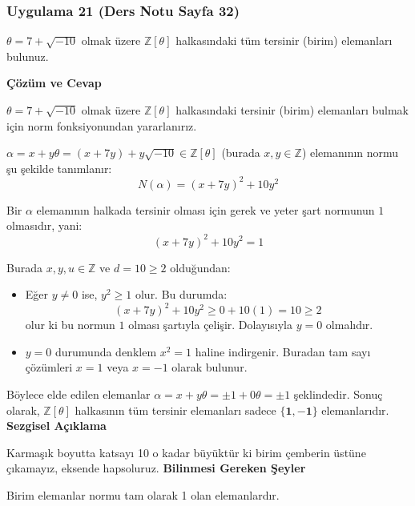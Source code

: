 \documentclass[11pt, a4paper]{article}
\newenvironment{cozum}{
    \vspace{0.5cm}
    \noindent\textcolor{green!60!black}{\faCheckCircle\enspace \textbf{\Large Çözüm ve Cevap}}\par\vspace{0.2cm}
}{}
\newenvironment{sezgisel}{
    \vspace{0.5cm}
    \noindent\textcolor{orange!80!black}{\faLightbulb\enspace \textbf{\Large Sezgisel Açıklama}}\par\vspace{0.2cm}
    \itshape
}{}
\newenvironment{bilgi}{
    \vspace{0.5cm}
    \noindent\textcolor{red!70!black}{\faExclamationTriangle\enspace \textbf{\Large Bilinmesi Gereken Şeyler}}\par\vspace{0.2cm}
}{}
\begin{document}
\subsubsection{Uygulama 21 (Ders Notu Sayfa 32)}
\begin{sorubox}
$\theta = 7 + \sqrt{-10}$ olmak üzere $\mathbb{Z}[\theta]$ halkasındaki tüm tersinir (birim) elemanları bulunuz.
\end{sorubox}
\begin{cozum}
$\theta = 7 + \sqrt{-10}$ olmak üzere $\mathbb{Z}[\theta]$ halkasındaki tersinir (birim) elemanları bulmak için norm fonksiyonundan yararlanırız.

$\alpha = x + y\theta = (x + 7y) + y\sqrt{-10} \in \mathbb{Z}[\theta]$ (burada $x, y \in \mathbb{Z}$) elemanının normu şu şekilde tanımlanır:
\[ N(\alpha) = (x + 7y)^2 + 10 y^2 \]

Bir $\alpha$ elemanının halkada tersinir olması için gerek ve yeter şart normunun $1$ olmasıdır, yani:
\[ (x + 7y)^2 + 10 y^2 = 1 \]

Burada $x, y, u \in \mathbb{Z}$ ve $d = 10 \ge 2$ olduğundan:
\begin{itemize}
    \item Eğer $y \neq 0$ ise, $y^2 \ge 1$ olur. Bu durumda:
    \[ (x + 7y)^2 + 10 y^2 \ge 0 + 10(1) = 10 \ge 2 \]
    olur ki bu normun $1$ olması şartıyla çelişir. Dolayısıyla $y = 0$ olmalıdır.
    \item $y = 0$ durumunda denklem $x^2 = 1$ haline indirgenir. Buradan tam sayı çözümleri $x = 1$ veya $x = -1$ olarak bulunur.
\end{itemize}

Böylece elde edilen elemanlar $\alpha = x + y\theta = \pm 1 + 0\theta = \pm 1$ şeklindedir. Sonuç olarak, $\mathbb{Z}[\theta]$ halkasının tüm tersinir elemanları sadece $\mathbf{\{1, -1\}}$ elemanlarıdır.
\end{cozum}
\begin{sezgisel}
Karmaşık boyutta katsayı 10 o kadar büyüktür ki birim çemberin üstüne çıkamayız, eksende hapsoluruz.
\end{sezgisel}
\begin{bilgi}
Birim elemanlar normu tam olarak 1 olan elemanlardır.
\end{bilgi}

\newpage
\end{document}
